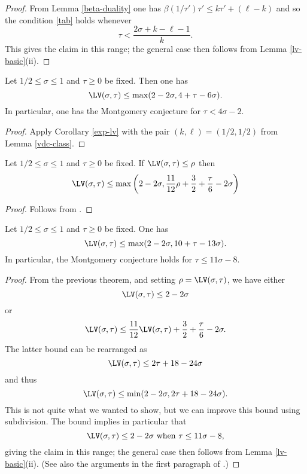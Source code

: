 \begin{proof}  From Lemma \ref{beta-duality} one has
    $\beta(1/\tau') \tau' \leq k \tau' + (\ell-k)$
and so the condition \eqref{tab} holds whenever
$$ \tau < \frac{2\sigma+k-\ell-1}{k}.$$
This gives the claim in this range; the general case then follows from Lemma \ref{lv-basic}(ii).
\end{proof}

\begin{theorem}\label{huxley-lv}\cite[Equation~(2.9)]{Huxley} Let $1/2 \leq \sigma \leq 1$ and $\tau \geq 0$ be fixed.  Then one has
    $$ \LV(\sigma,\tau) \leq \max( 2-2\sigma, 4 + \tau - 6 \sigma).$$
    In particular, one has the Montgomery conjecture for $\tau < 4 \sigma - 2$.
\end{theorem}

\begin{proof}  Apply Corollary \ref{exp-lv} with the pair $(k,\ell) = (1/2,1/2)$ from Lemma \ref{vdc-class}.
\end{proof}





\begin{theorem} Let $1/2 \leq \sigma \leq 1$ and $\tau \geq 0$ be fixed.  If $\LV(\sigma, \tau) \le \rho$ then 
    \[
    \LV(\sigma, \tau) \le \max\left(2 - 2\sigma, \frac{11}{12}\rho + \frac{3}{2} + \frac{\tau}{6} - 2\sigma\right)
    \]
    \end{theorem}

    \begin{proof}
    Follows from \cite[Lemma~1]{heathbrown_zero_1979}.
    \end{proof}
    
\begin{theorem}\label{hb-opt} Let $1/2 \leq \sigma \leq 1$ and $\tau \geq 0$ be fixed.   One has
    $$ \LV(\sigma,\tau) \leq \max( 2-2\sigma, 10 + \tau - 13 \sigma).$$
In particular, the Montgomery conjecture holds for $\tau \leq 11 \sigma - 8$.
\end{theorem}

\begin{proof}  From the previous theorem, and setting $\rho = \LV(\sigma,\tau)$, we have either
$$ \LV(\sigma,\tau) \leq 2-2\sigma$$
or
$$ \LV(\sigma,\tau) \leq \frac{11}{12}\LV(\sigma,\tau) + \frac{3}{2} + \frac{\tau}{6} - 2\sigma.$$
The latter bound can be rearranged as
$$ \LV(\sigma,\tau) \leq 2\tau + 18 - 24\sigma$$
and thus
$$ \LV(\sigma,\tau) \leq \min( 2-2\sigma, 2\tau + 18 - 24\sigma).$$
This is not quite what we wanted to show, but we can improve this bound using subdivision.  The bound implies in particular that
$$ \LV(\sigma,\tau) \leq 2-2\sigma \hbox{ when } \tau \leq 11 \sigma - 8,$$
giving the claim in this range; the general case then follows from Lemma \ref{lv-basic}(ii).  (See also the arguments in the first paragraph of \cite[p. 226]{heathbrown_zero_1979}.)
\end{proof}


